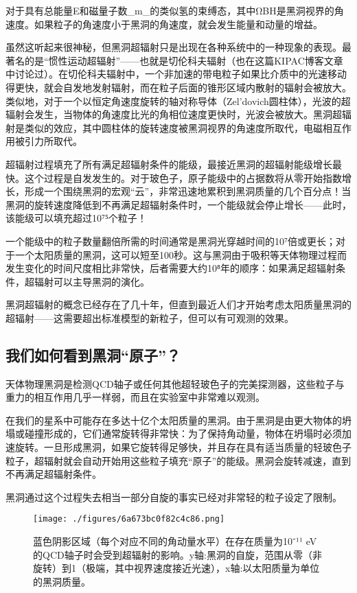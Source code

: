 对于具有总能量E和磁量子数_m_的类似氢的束缚态，其中ΩBH是黑洞视界的角速度。如果粒子的角速度小于黑洞的角速度，就会发生能量和动量的增益。

虽然这听起来很神秘，但黑洞超辐射只是出现在各种系统中的一种现象的表现。最著名的是“惯性运动超辐射”——也就是切伦科夫辐射（也在这篇KIPAC博客文章中讨论过）。在切伦科夫辐射中，一个非加速的带电粒子如果比介质中的光速移动得更快，就会自发地发射辐射，而在粒子后面的锥形区域内散射的辐射会被放大。类似地，对于一个以恒定角速度旋转的轴对称导体（Zel’dovich圆柱体），光波的超辐射会发生，当物体的角速度比光的角相位速度更快时，光波会被放大。黑洞超辐射是类似的效应，其中圆柱体的旋转速度被黑洞视界的角速度所取代，电磁相互作用被引力所取代。

超辐射过程填充了所有满足超辐射条件的能级，最接近黑洞的超辐射能级增长最快。这个过程是自发发生的。对于玻色子，原子能级中的占据数将从零开始指数增长，形成一个围绕黑洞的宏观“云”，非常迅速地累积到黑洞质量的几个百分点！当黑洞的旋转速度降低到不再满足超辐射条件时，一个能级就会停止增长——此时，该能级可以填充超过10⁷⁵个粒子！

一个能级中的粒子数量翻倍所需的时间通常是黑洞光穿越时间的10⁷倍或更长；对于一个太阳质量的黑洞，这可以短至100秒。这与黑洞由于吸积等天体物理过程而发生变化的时间尺度相比非常快，后者需要大约10⁸年的顺序：如果满足超辐射条件，超辐射可以主导黑洞的演化。

黑洞超辐射的概念已经存在了几十年，但直到最近人们才开始考虑太阳质量黑洞的超辐射——这需要超出标准模型的新粒子，但可以有可观测的效果。

\subsection{我们如何看到黑洞“原子”？}

天体物理黑洞是检测QCD轴子或任何其他超轻玻色子的完美探测器，这些粒子与重力的相互作用几乎一样弱，而且在实验室中非常难以观测。

在我们的星系中可能存在多达十亿个太阳质量的黑洞。由于黑洞是由更大物体的坍塌或碰撞形成的，它们通常旋转得非常快：为了保持角动量，物体在坍塌时必须加速旋转。一旦形成黑洞，如果它旋转得足够快，并且存在具有适当质量的轻玻色子粒子，超辐射就会自动开始用这些粒子填充“原子”的能级。黑洞会旋转减速，直到不再满足超辐射条件。

黑洞通过这个过程失去相当一部分自旋的事实已经对非常轻的粒子设定了限制。

\begin{figure}[ht]
\centering
\texttt{[image: ./figures/6a673bc0f82c4c86.png]}
\caption{蓝色阴影区域（每个对应不同的角动量水平）在存在质量为10⁻¹¹ eV的QCD轴子时会受到超辐射的影响。y轴:黑洞的自旋，范围从零（非旋转）到1（极端，其中视界速度接近光速），x轴:以太阳质量为单位的黑洞质量。} \label{fig_GAtom_3}
\end{figure}

